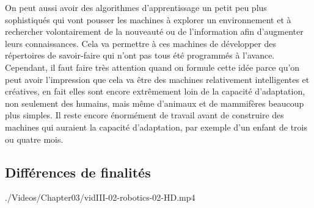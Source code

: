 On peut aussi avoir des algorithmes d'apprentissage un petit peu plus sophistiqués qui vont pousser les machines à explorer un environnement et à rechercher volontairement de la nouveauté ou de l'information afin d'augmenter leurs connaissances. Cela va permettre à ces machines de développer des répertoires de savoir-­faire qui n'ont pas tous été programmés à l'avance. Cependant, il faut faire très attention quand on formule cette idée parce qu'on peut avoir l'impression que cela va être des machines relativement intelligentes et créatives, en fait elles sont encore extrêmement loin de la capacité d'adaptation, non seulement des humains, mais même d'animaux et de mammifères beaucoup plus simples. Il reste encore énormément de travail avant de construire des machines qui auraient la capacité d'adaptation, par exemple d'un enfant de trois ou quatre mois.


\subsection[Différences de finalités]{Différences de finalités}
\label{sub:III.2.2}

\begin{marginvideo}
		{./Videos/Chapter03/vidIII-02-robotics-02-HD.mp4}%
\end{marginvideo}

